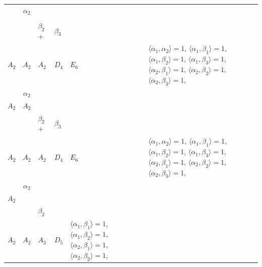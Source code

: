 \documentclass[12pt]{report}
\begin{document}
\begin{appendix}
{\begin{longtable}{rcl p{1cm}p{1cm}p{3cm} }
\begin{tabular}{cc}$\alpha_1$+ & $\alpha_2$\\\tiny{  } & \tiny{  }\end{tabular} &\begin{tabular}{c} = \\~ \end{tabular} & \begin{tabular}{ccc}$\beta_1$+ & $\beta_2$+ & $\beta_3$\\\tiny{ $A_2$ } & \tiny{ $A_2$ } & \tiny{ $A_2$ }\end{tabular} & $D_4$ & $E_6$ & $\langle\alpha_1, \alpha_2\rangle=1$,  $\langle\alpha_1, \beta_1\rangle=1$, $\langle\alpha_1, \beta_2\rangle=1$, $\langle\alpha_1, \beta_3\rangle=1$, $\langle\alpha_2, \beta_1\rangle=1$, $\langle\alpha_2, \beta_2\rangle=1$, $\langle\alpha_2, \beta_3\rangle=1$, 
\\
\begin{tabular}{cc}$\alpha_1$+ & $\alpha_2$\\\tiny{ $A_2$ } & \tiny{ $A_2$ }\end{tabular} &\begin{tabular}{c} = \\~ \end{tabular} & \begin{tabular}{ccc}$\beta_1$+ & $\beta_2$+ & $\beta_3$\\\tiny{ $A_2$ } & \tiny{ $A_2$ } & \tiny{ $A_2$ }\end{tabular} & $D_4$ & $E_6$ & $\langle\alpha_1, \alpha_2\rangle=1$,  $\langle\alpha_1, \beta_1\rangle=1$, $\langle\alpha_1, \beta_2\rangle=1$, $\langle\alpha_1, \beta_3\rangle=1$, $\langle\alpha_2, \beta_1\rangle=1$, $\langle\alpha_2, \beta_2\rangle=1$, $\langle\alpha_2, \beta_3\rangle=1$, 
\\
\begin{tabular}{cc}$\alpha_1$+ & $\alpha_2$\\\tiny{ $A_2$ } & \tiny{  }\end{tabular} &\begin{tabular}{c} = \\~ \end{tabular} & \begin{tabular}{cc}$\beta_1$+ & $\beta_2$\\\tiny{ $A_2$ } & \tiny{ $A_2$ }\end{tabular} & $A_3$ & $D_5$ &  $\langle\alpha_1, \beta_1\rangle=1$, $\langle\alpha_1, \beta_2\rangle=1$, $\langle\alpha_2, \beta_1\rangle=1$, $\langle\alpha_2, \beta_2\rangle=1$, 

\end{longtable}}
\end{appendix}
\end{document}
